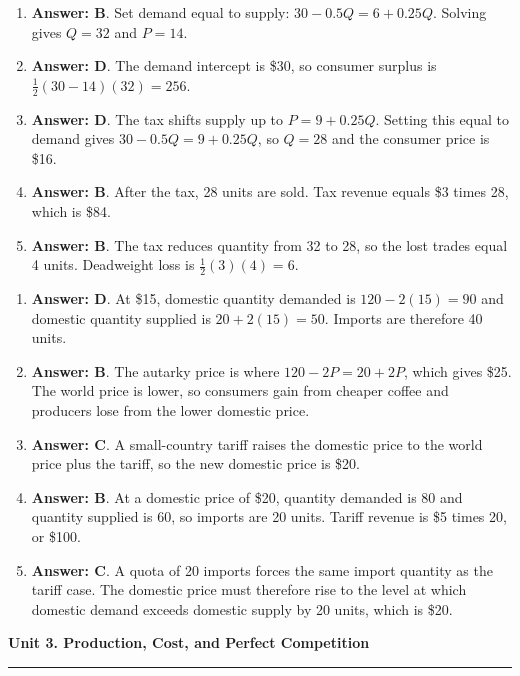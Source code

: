 \documentclass[10pt]{article}
\newcommand{\unitheader}[2]{%
  \vspace{0.35em}
  {\Large\bfseries Unit #1. #2\par}
  \vspace{0.2em}
  \hrule
  \vspace{0.55em}
}
\begin{document}
\begin{enumerate}[resume*=aps, leftmargin=*, itemsep=0.6em, topsep=0.2em, parsep=0pt]
\item \textbf{Answer: B}. Set demand equal to supply: $30-0.5Q = 6+0.25Q$. Solving gives $Q=32$ and $P=14$.
\item \textbf{Answer: D}. The demand intercept is \$30, so consumer surplus is $\tfrac{1}{2}(30-14)(32)=256$.
\item \textbf{Answer: D}. The tax shifts supply up to $P = 9 + 0.25Q$. Setting this equal to demand gives $30 - 0.5Q = 9 + 0.25Q$, so $Q=28$ and the consumer price is \$16.
\item \textbf{Answer: B}. After the tax, 28 units are sold. Tax revenue equals \$3 times 28, which is \$84.
\item \textbf{Answer: B}. The tax reduces quantity from 32 to 28, so the lost trades equal 4 units. Deadweight loss is $\tfrac{1}{2}(3)(4)=6$.
\end{enumerate}
\begin{enumerate}[resume*=aps, leftmargin=*, itemsep=0.6em, topsep=0.2em, parsep=0pt]
\item \textbf{Answer: D}. At \$15, domestic quantity demanded is $120-2(15)=90$ and domestic quantity supplied is $20+2(15)=50$. Imports are therefore 40 units.
\item \textbf{Answer: B}. The autarky price is where $120-2P = 20+2P$, which gives \$25. The world price is lower, so consumers gain from cheaper coffee and producers lose from the lower domestic price.
\item \textbf{Answer: C}. A small-country tariff raises the domestic price to the world price plus the tariff, so the new domestic price is \$20.
\item \textbf{Answer: B}. At a domestic price of \$20, quantity demanded is 80 and quantity supplied is 60, so imports are 20 units. Tariff revenue is \$5 times 20, or \$100.
\item \textbf{Answer: C}. A quota of 20 imports forces the same import quantity as the tariff case. The domestic price must therefore rise to the level at which domestic demand exceeds domestic supply by 20 units, which is \$20.
\end{enumerate}
\unitheader{3}{Production, Cost, and Perfect Competition}
\end{document}

